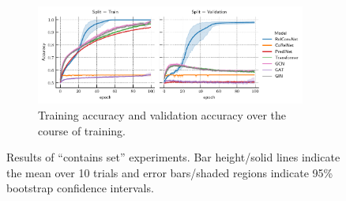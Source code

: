 \begin{figure}[ht]
    \begin{subfigure}[t]{0.97\textwidth}
        \centering
        \includegraphics[width=0.975\textwidth]{figs/experiments/contains_set_training_curves.pdf}
        \caption{Training accuracy and validation accuracy over the course of training.}\label{fig:contains_set_training_curves}
    \end{subfigure}
    \caption{Results of ``contains set'' experiments. Bar height/solid lines indicate the mean over 10 trials and error bars/shaded regions indicate 95\% bootstrap confidence intervals.}\label{fig:contains_set_experiment}
\end{figure}


